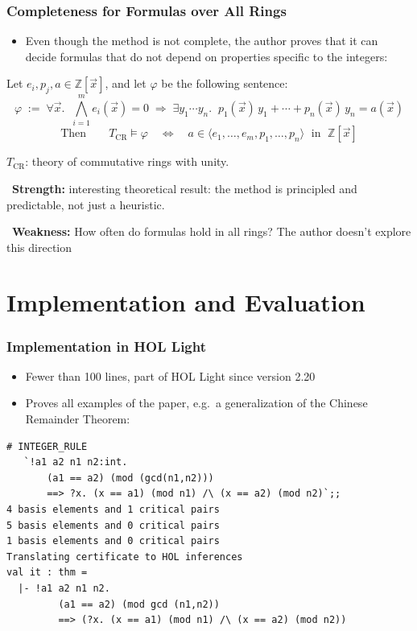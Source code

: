 \documentclass[usepdftitle=false,aspectratio=169,usenames,dvipsnames]{beamer}
\newcommand{\bluecheck}{{\color{blue}\checkmark}}
\newcommand{\redmark}{\color{red}{\ding{55}}}
\newcommand{\strength}[1]{\begin{strengthbox}\small\bluecheck\ \textbf{Strength:} #1\end{strengthbox}}
\newcommand{\weakness}[1]{\begin{weaknessbox}\small{\redmark}\ \textbf{Weakness:} #1\end{weaknessbox}}
\begin{document}
\begin{frame}
  \frametitle{Completeness for Formulas over All Rings}
  \begin{itemize}
    \item Even though the method is not complete, the author proves that it can decide formulas that do not depend on properties specific to the integers:
  \end{itemize}
  \pause
  \vfill
  \begin{theorem}
    \abovedisplayskip=3pt \belowdisplayskip=3pt
    Let $e_i, p_j, a \in \mathbb{Z}[\vec{x}]$, and let $\varphi$ be the following sentence:
    \[
      \varphi \;:=\; \forall \vec{x}.\;\; \textstyle\bigwedge_{i=1}^{m} e_i(\vec{x}) = 0 \;\Rightarrow\; \exists y_1 \cdots y_n.\;\; p_1(\vec{x})\, y_1 + \cdots + p_n(\vec{x})\, y_n = a(\vec{x})
    \]
    \[
      \text{Then} \qquad T_{\mathrm{CR}} \models \varphi
      \quad\Longleftrightarrow\quad
      a \in \langle e_1, \dots, e_m, p_1, \dots, p_n \rangle \;\text{ in }\; \mathbb{Z}[\vec{x}]
    \]
  \end{theorem}
  {\footnotesize $T_{\mathrm{CR}}$: theory of commutative rings with unity.}
  \pause
  \vfill
  \strength{interesting theoretical result: the method is principled and predictable, not just a heuristic.}
  \pause
  \weakness{How often do formulas hold in all rings? The author doesn't explore this direction}
\end{frame}

\section{Implementation and Evaluation}

\begin{frame}[fragile]
  \frametitle{Implementation in HOL Light}
  \begin{itemize}
    \item Fewer than 100 lines, part of HOL Light since version 2.20
    \item Proves all examples of the paper, e.g.\ a generalization of the Chinese Remainder Theorem:
  \end{itemize}
  \vfill
  \begin{lstlisting}[basicstyle=\ttfamily\footnotesize, columns=fullflexible, keepspaces=true, xleftmargin=1em]
# INTEGER_RULE
   `!a1 a2 n1 n2:int.
       (a1 == a2) (mod (gcd(n1,n2)))
       ==> ?x. (x == a1) (mod n1) /\ (x == a2) (mod n2)`;;
4 basis elements and 1 critical pairs
5 basis elements and 0 critical pairs
1 basis elements and 0 critical pairs
Translating certificate to HOL inferences
val it : thm =
  |- !a1 a2 n1 n2.
         (a1 == a2) (mod gcd (n1,n2))
         ==> (?x. (x == a1) (mod n1) /\ (x == a2) (mod n2))
  \end{lstlisting}
\end{frame}
\end{document}
